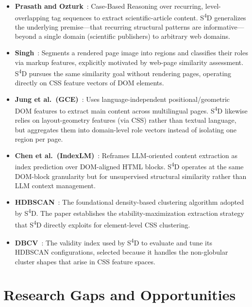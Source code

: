 \begin{itemize}
    \item \textbf{Prasath and Ozturk}~\cite{prasath2016cbr}: Case-Based Reasoning over recurring, level-overlapping tag sequences to extract scientific-article content. S\textsuperscript{4}D generalizes the underlying premise---that recurring structural patterns are informative---beyond a single domain (scientific publishers) to arbitrary web domains.

    \item \textbf{Singh}~\cite{singh2014regions}: Segments a rendered page image into regions and classifies their roles via markup features, explicitly motivated by web-page similarity assessment. S\textsuperscript{4}D pursues the same similarity goal without rendering pages, operating directly on CSS feature vectors of DOM elements.

    \item \textbf{Jung et al.\ (GCE)}~\cite{jung2021dontread}: Uses language-independent positional/geometric DOM features to extract main content across multilingual pages. S\textsuperscript{4}D likewise relies on layout-geometry features (via CSS) rather than textual language, but aggregates them into domain-level role vectors instead of isolating one region per page.

    \item \textbf{Chen et al.\ (IndexLM)}~\cite{chen2025indexlm}: Reframes LLM-oriented content extraction as index prediction over DOM-aligned HTML blocks. S\textsuperscript{4}D operates at the same DOM-block granularity but for unsupervised structural similarity rather than LLM context management.

    \item \textbf{HDBSCAN}~\cite{campello2015hdbscan}: The foundational density-based clustering algorithm adopted by S\textsuperscript{4}D. The paper establishes the stability-maximization extraction strategy that S\textsuperscript{4}D directly exploits for element-level CSS clustering.

    \item \textbf{DBCV}~\cite{moulavi2014dbcv}: The validity index used by S\textsuperscript{4}D to evaluate and tune its HDBSCAN configurations, selected because it handles the non-globular cluster shapes that arise in CSS feature spaces.
\end{itemize}

\section{Research Gaps and Opportunities}
\label{sec:research-gaps}

